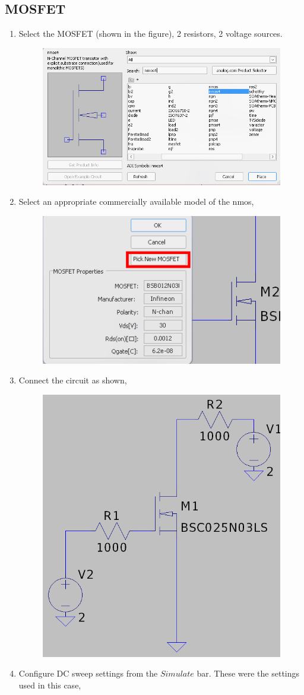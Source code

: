 \documentclass[12pt,a4paper]{report}
\begin{document}
\subsection{MOSFET}
\begin{enumerate}
    \item Select the MOSFET (shown in the figure), 2 resistors, 2 voltage sources.
    \begin{figure}[h!]
        \centering
        \includegraphics[width = 0.6\linewidth]{figs/component-nmos.png}
        \label{fig:placeholder}
    \end{figure}
    \item Select an appropriate commercially available model of the nmos,
    \begin{figure}[h!]
        \centering
        \includegraphics[width=0.5\linewidth]{figs/mosfet-model.png}
        \label{fig:placeholder}
    \end{figure}
    \item Connect the circuit as shown,
    \pagebreak
    \begin{figure}[h!]
        \centering
        \includegraphics[width=0.5\linewidth]{figs/mosfet-circuit.png}
        \label{fig:placeholder}
    \end{figure}
    \item Configure DC sweep settings from the $Simulate$ bar. These were the settings used in this case,
  \begin{figure}[h!]
  \centering
  

\end{figure}
\end{enumerate}
\end{document}

